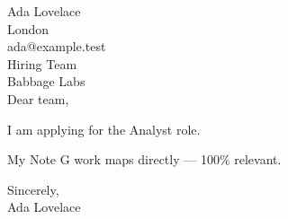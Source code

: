 \documentclass[11pt]{article}
\begin{document}
Ada Lovelace\\
London\\
ada@example.test\\[10pt]
Hiring Team\\
Babbage Labs\\[10pt]
Dear team,

I am applying for the Analyst role.

My Note G work maps directly — 100\% relevant.

Sincerely,\\[8pt]
Ada Lovelace
\end{document}
